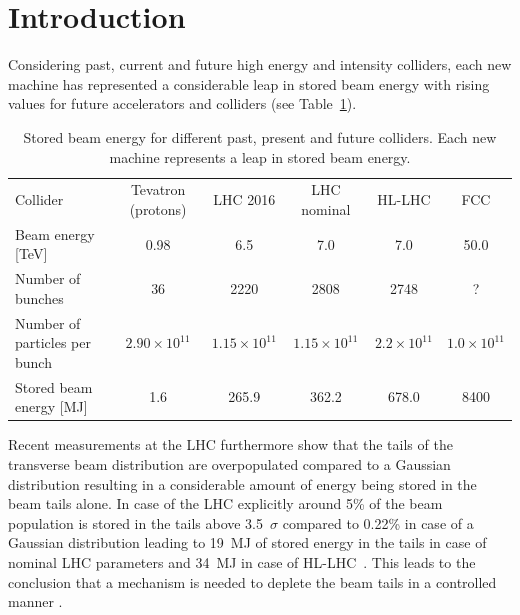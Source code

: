 \documentclass[%
 reprint,
 amsmath,amssymb,
 aps,
prstab,
]{revtex4-1}
\begin{document}
\maketitle


\section{Introduction\label{sec:intro}}%
Considering past, current and future high energy and intensity colliders, each new machine has represented a considerable leap in stored beam energy with rising values for future accelerators and colliders (see Table~\ref{tab:stored_energy}). 
\begin{table}
	\caption{\label{tab:stored_energy}%
		Stored beam energy for different past, present and future colliders. Each new machine represents a leap in stored beam energy.
	}
	\begin{ruledtabular}
		\begin{tabular}{lccccc}
			Collider& Tevatron (protons) \cite{tevatron} & LHC 2016 \cite{chamonix2017param}
			& LHC nominal \cite{lhc_design} & HL-LHC \cite{hlcdr} & FCC \cite{fcc_param_2017} \\
			\colrule
			Beam energy [TeV] & 0.98 & 6.5 & 7.0 & 7.0 & 50.0\\
			Number of bunches & 36 & 2220 & 2808 & 2748 & ? \\
			Number of particles per bunch & $2.90\times 10^{11}$ & $1.15\times 10^{11}$ & $1.15\times 10^{11}$ & $2.2\times 10^{11}$ & $1.0\times 10^{11}$\\
			Stored beam energy [MJ] & 1.6 & 265.9 & 362.2 & 678.0 & 8400 \\
		\end{tabular}
	\end{ruledtabular}
\end{table}
Recent measurements at the LHC furthermore show that the tails of the transverse beam distribution are overpopulated compared to a Gaussian distribution resulting in a considerable amount of energy being stored in the beam tails alone. In case of the LHC explicitly around 5\% of the beam population is stored in the tails above 3.5~$\sigma$ compared to 0.22\% in case of a Gaussian distribution leading to 19~MJ of stored energy in the tails in case of nominal LHC parameters and 34~MJ in case of HL-LHC~\cite{helreview_valentino}. This leads to the conclusion that a mechanism is needed to deplete the beam tails in a controlled manner \cite{helreview}.
\end{document}
